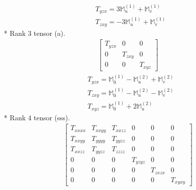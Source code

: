 \documentclass[fleqn,8pt,landscape]{jsarticle}
\begin{document}
\begin{align*}
& T_{yzx} = 3 \mathbb{M}_{u}^{(1)} + \mathbb{M}_{v}^{(1)} \\
& T_{zxy} = - 3 \mathbb{M}_{u}^{(1)} + \mathbb{M}_{v}^{(1)}
\end{align*}
* Rank 3 tensor (a).
\begin{align*}
\begin{bmatrix} T_{yzx} & 0 & 0 \\ 0 & T_{zxy} & 0 \\ 0 & 0 & T_{xyz} \end{bmatrix}
\end{align*}
\begin{align*}
& T_{yzx} = \mathbb{M}_{0}^{(1)} - \mathbb{M}_{u}^{(2)} + \mathbb{M}_{v}^{(2)} \\
& T_{zxy} = \mathbb{M}_{0}^{(1)} - \mathbb{M}_{u}^{(2)} - \mathbb{M}_{v}^{(2)} \\
& T_{xyz} = \mathbb{M}_{0}^{(1)} + 2 \mathbb{M}_{u}^{(2)}
\end{align*}
* Rank 4 tensor (sss).
\begin{align*}
\begin{bmatrix} T_{xxxx} & T_{xxyy} & T_{xxzz} & 0 & 0 & 0 \\ T_{xxyy} & T_{yyyy} & T_{yyzz} & 0 & 0 & 0 \\ T_{xxzz} & T_{yyzz} & T_{zzzz} & 0 & 0 & 0 \\ 0 & 0 & 0 & T_{yzyz} & 0 & 0 \\ 0 & 0 & 0 & 0 & T_{zxzx} & 0 \\ 0 & 0 & 0 & 0 & 0 & T_{xyxy} \end{bmatrix}
\end{align*}
\end{document}
